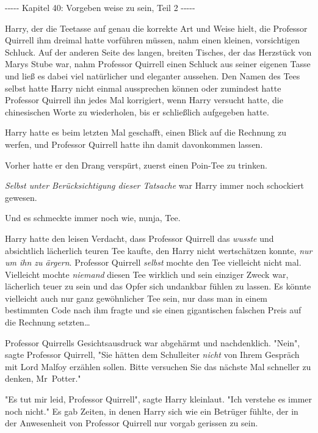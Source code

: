 

\hypertarget{vorgeben-weise-zu-sein-teil-2}{%

-\/-\/-\/-\/- Kapitel 40: Vorgeben weise zu sein, Teil 2 -\/-\/-\/-\/-

Harry, der die Teetasse auf genau die korrekte Art und Weise hielt, die Professor Quirrell ihm dreimal hatte vorführen müssen, nahm einen kleinen, vorsichtigen Schluck. Auf der anderen Seite des langen, breiten Tisches, der das Herzstück von Marys Stube war, nahm Professor Quirrell einen Schluck aus seiner eigenen Tasse und ließ es dabei viel natürlicher und eleganter aussehen. Den Namen des Tees selbst hatte Harry nicht einmal aussprechen können oder zumindest hatte Professor Quirrell ihn jedes Mal korrigiert, wenn Harry versucht hatte, die chinesischen Worte zu wiederholen, bis er schließlich aufgegeben hatte.

Harry hatte es beim letzten Mal geschafft, einen Blick auf die Rechnung zu werfen, und Professor Quirrell hatte ihn damit davonkommen lassen.

Vorher hatte er den Drang verspürt, zuerst einen Poin-Tee zu trinken.

\emph{Selbst unter Berücksichtigung dieser Tatsache} war Harry immer noch schockiert gewesen.

Und es schmeckte immer noch wie, nunja, Tee.

Harry hatte den leisen Verdacht, dass Professor Quirrell das \emph{wusste} und absichtlich lächerlich teuren Tee kaufte, den Harry nicht wertschätzen konnte, \emph{nur um ihn zu ärgern}. Professor Quirrell \emph{selbst} mochte den Tee vielleicht nicht mal. Vielleicht mochte \emph{niemand} diesen Tee wirklich und sein einziger Zweck war, lächerlich teuer zu sein und das Opfer sich undankbar fühlen zu lassen. Es könnte vielleicht auch nur ganz gewöhnlicher Tee sein, nur dass man in einem bestimmten Code nach ihm fragte und sie einen gigantischen falschen Preis auf die Rechnung setzten…

Professor Quirrells Gesichtsausdruck war abgehärmt und nachdenklich. "Nein", sagte Professor Quirrell, "Sie hätten dem Schulleiter \emph{nicht} von Ihrem Gespräch mit Lord Malfoy erzählen sollen. Bitte versuchen Sie das nächste Mal schneller zu denken, Mr~Potter."

"Es tut mir leid, Professor Quirrell", sagte Harry kleinlaut. "Ich verstehe es immer noch nicht." Es gab Zeiten, in denen Harry sich wie ein Betrüger fühlte, der in der Anwesenheit von Professor Quirrell nur vorgab gerissen zu sein.

}
